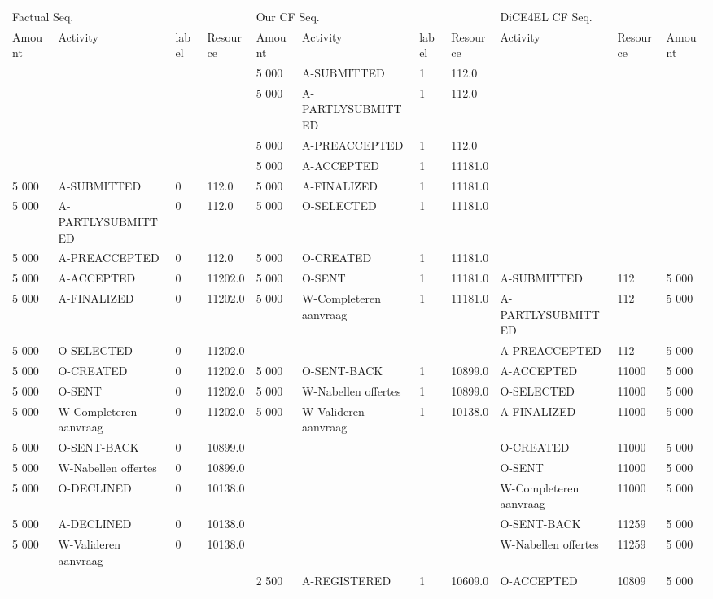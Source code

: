 \begin{tabular}{lllllllllll}
\toprule
\multicolumn{4}{l}{Factual Seq.} & \multicolumn{4}{l}{Our CF Seq.} & \multicolumn{3}{l}{DiCE4EL CF Seq.} \\
Amount & Activity & label & Resource & Amount & Activity & label & Resource & Activity & Resource & Amount \\
\midrule
 &  &  &  & 5 000 & A-SUBMITTED & 1 & 112.0 &  &  &  \\
 &  &  &  & 5 000 & A-PARTLYSUBMITTED & 1 & 112.0 &  &  &  \\
 &  &  &  & 5 000 & A-PREACCEPTED & 1 & 112.0 &  &  &  \\
 &  &  &  & 5 000 & A-ACCEPTED & 1 & 11181.0 &  &  &  \\
5 000 & A-SUBMITTED & 0 & 112.0 & 5 000 & A-FINALIZED & 1 & 11181.0 &  &  &  \\
5 000 & A-PARTLYSUBMITTED & 0 & 112.0 & 5 000 & O-SELECTED & 1 & 11181.0 &  &  &  \\
5 000 & A-PREACCEPTED & 0 & 112.0 & 5 000 & O-CREATED & 1 & 11181.0 &  &  &  \\
5 000 & A-ACCEPTED & 0 & 11202.0 & 5 000 & O-SENT & 1 & 11181.0 & A-SUBMITTED & 112 & 5 000 \\
5 000 & A-FINALIZED & 0 & 11202.0 & 5 000 & W-Completeren aanvraag & 1 & 11181.0 & A-PARTLYSUBMITTED & 112 & 5 000 \\
5 000 & O-SELECTED & 0 & 11202.0 &  &  &  &  & A-PREACCEPTED & 112 & 5 000 \\
5 000 & O-CREATED & 0 & 11202.0 & 5 000 & O-SENT-BACK & 1 & 10899.0 & A-ACCEPTED & 11000 & 5 000 \\
5 000 & O-SENT & 0 & 11202.0 & 5 000 & W-Nabellen offertes & 1 & 10899.0 & O-SELECTED & 11000 & 5 000 \\
5 000 & W-Completeren aanvraag & 0 & 11202.0 & 5 000 & W-Valideren aanvraag & 1 & 10138.0 & A-FINALIZED & 11000 & 5 000 \\
5 000 & O-SENT-BACK & 0 & 10899.0 &  &  &  &  & O-CREATED & 11000 & 5 000 \\
5 000 & W-Nabellen offertes & 0 & 10899.0 &  &  &  &  & O-SENT & 11000 & 5 000 \\
5 000 & O-DECLINED & 0 & 10138.0 &  &  &  &  & W-Completeren aanvraag & 11000 & 5 000 \\
5 000 & A-DECLINED & 0 & 10138.0 &  &  &  &  & O-SENT-BACK & 11259 & 5 000 \\
5 000 & W-Valideren aanvraag & 0 & 10138.0 &  &  &  &  & W-Nabellen offertes & 11259 & 5 000 \\
 &  &  &  & 2 500 & A-REGISTERED & 1 & 10609.0 & O-ACCEPTED & 10809 & 5 000 \\
\bottomrule
\end{tabular}
